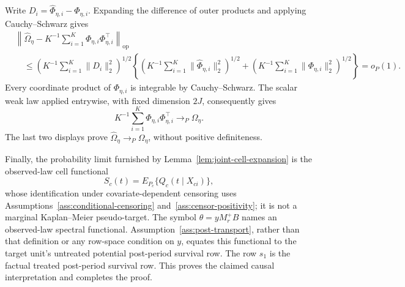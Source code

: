 Write \(D_i=\widehat\Phi_{\eta,i}-\Phi_{\eta,i}\). Expanding the difference of outer products and applying Cauchy--Schwarz gives
\[
\begin{aligned}
 &\left\|\widehat\Omega_\eta-
 K^{-1}\sum_{i=1}^K\Phi_{\eta,i}\Phi_{\eta,i}^\top\right\|_{\mathrm{op}}\\
 &\quad\le
 \left(K^{-1}\sum_{i=1}^K\|D_i\|_2^2\right)^{1/2}
 \left\{
  \left(K^{-1}\sum_{i=1}^K\|\widehat\Phi_{\eta,i}\|_2^2\right)^{1/2}
  +
  \left(K^{-1}\sum_{i=1}^K\|\Phi_{\eta,i}\|_2^2\right)^{1/2}
 \right\}
 =o_P(1).
\end{aligned}
\]
Every coordinate product of \(\Phi_{\eta,i}\) is integrable by Cauchy--Schwarz. The scalar weak law applied entrywise, with fixed dimension \(2J\), consequently gives
\[
 K^{-1}\sum_{i=1}^K\Phi_{\eta,i}\Phi_{\eta,i}^\top
 \to_P\Omega_\eta.
\]
The last two displays prove \(\widehat\Omega_\eta\to_P\Omega_\eta\), without positive definiteness.

Finally, the probability limit furnished by Lemma~\ref{lem:joint-cell-expansion} is the observed-law cell functional
\[
 S_c(t)=E_{P_c}\{Q_c(t\mid X_{ci})\},
\]
whose identification under covariate-dependent censoring uses Assumptions~\ref{ass:conditional-censoring} and~\ref{ass:censor-positivity}; it is not a marginal Kaplan--Meier pseudo-target. The symbol \(\theta=yM_r^+B\) names an observed-law spectral functional. Assumption~\ref{ass:post-transport}, rather than that definition or any row-space condition on \(y\), equates this functional to the target unit's untreated potential post-period survival row. The row \(s_1\) is the factual treated post-period survival row. This proves the claimed causal interpretation and completes the proof.
